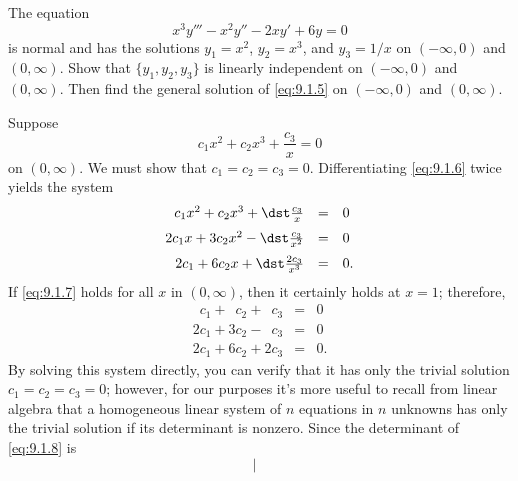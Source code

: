 \setcounter{example}{0}
\setcounter{equation}{4}
\begin{example}
  \label{example:9.1.1}\rm The equation
  \begin{equation}
    \label{eq:9.1.5}x^{3}y'''-x^{2}y''-2xy'+6y=0
  \end{equation}
  is normal and has the solutions $y_{1}=x^{2}$, $y_{2}=x^{3}$, and $y_{3}=1/x$ on $(-\infty,0)$ and
  $(0,\infty)$. Show that $\{y_{1},y_{2},y_{3}\}$ is linearly independent on $(-\infty,0)$ and
  $(0,\infty)$. Then find the general solution of \eqref{eq:9.1.5} on $(-\infty,0)$ and
  $(0,\infty)$.
\end{example}
\setcounter{equation}{5}
\begin{examplesolution}
\solution Suppose
\begin{equation}
  \label{eq:9.1.6}c_{1}x^{2}+c_{2}x^{3}+\frac{c_{3}}{x}=0
\end{equation}
on $(0,\infty)$. We must show that $c_{1}=c_{2}=c_{3}=0$. Differentiating \eqref{eq:9.1.6} twice
yields the system
\begin{equation}
  \label{eq:9.1.7}
  \begin{array}{rcl}
    c_{1}x^{2}+c_{2}x^{3}+\dst\frac{c_{3}}{x}   & = & 0  \\[2\jot]
    2c_{1}x+3c_{2}x^{2}-\dst\frac{c_{3}}{x^{2}} & = & 0  \\[2\jot]
    2c_{1}+6c_{2}x+\dst\frac{2c_{3}}{x^{3}}     & = & 0.
  \end{array}
\end{equation}
If \eqref{eq:9.1.7} holds for all $x$ in $(0,\infty)$, then it certainly holds at $x=1$; therefore,
\begin{equation}
  \label{eq:9.1.8}
  \begin{array}{rcl}
    \phantom{2}c_{1}+\phantom{3}c_{2}+\phantom{2}c_{3} & = & 0  \\
    2c_{1}+3c_{2}-\phantom{2}c_{3}                     & = & 0  \\
    2c_{1}+6c_{2}+2c_{3}                               & = & 0.
  \end{array}
\end{equation}
By solving this system directly, you can verify that it has only the trivial solution
$c_{1}=c_{2}=c_{3}=0$; however, for our purposes it's more useful to recall from linear algebra that
a homogeneous linear system of $n$ equations in $n$ unknowns has only the trivial solution if its
determinant is nonzero. Since the determinant of \eqref{eq:9.1.8} is
\[
  \left|
  \begin{array}{rrr}

\end{array}\]
\end{examplesolution}
